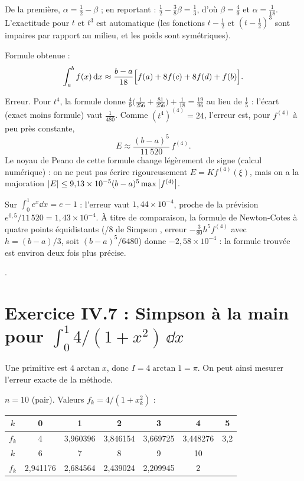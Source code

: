  De la première, $\alpha = \tfrac12 - \beta$ ; en reportant :
$\tfrac12 - \tfrac38\beta = \tfrac13$, d'où $\beta = \tfrac49$ et
$\alpha = \tfrac1{18}$. L'exactitude pour $t$ et $t^3$ est automatique (les
fonctions $t - \tfrac12$ et $(t - \tfrac12)^3$ sont impaires par rapport au
milieu, et les poids sont symétriques).

 Formule obtenue :
\[
  \int_a^b f(x)\,\mathrm{d} x \approx \frac{b-a}{18}\Bigl[f(a) + 8f(c) + 8f(d) + f(b)\Bigr] .
\]

 Erreur. Pour $t^4$, la formule donne
$\tfrac49\bigl(\tfrac1{256} + \tfrac{81}{256}\bigr) + \tfrac1{18} = \tfrac{19}{96}$
au lieu de $\tfrac15$ : l'écart (exact moins formule) vaut $\tfrac1{480}$. Comme
$(t^4)^{(4)} = 24$, l'erreur est, pour $f^{(4)}$ à peu près constante,
\[
  E \approx \frac{(b-a)^5}{11\,520}\,f^{(4)} .
\]
Le noyau de Peano de cette formule change légèrement de signe (calcul
numérique) : on ne peut pas écrire rigoureusement $E = K f^{(4)}(\xi)$, mais
on a la majoration $\left|E\right| \le 9{,}13\times 10^{-5}(b-a)^5\max\left|f^{(4)}\right|$.

\Verif Sur $\int_0^1 e^{x}\dd x = e - 1$ : l'erreur vaut $1{,}44\times 10^{-4}$,
proche de la prévision $e^{0{,}5}/11\,520 = 1{,}43\times 10^{-4}$. À titre de
comparaison, la formule de Newton-Cotes à quatre points équidistants
(/8 de Simpson \fg, erreur $-\tfrac{3}{80}h^5f^{(4)}$ avec
$h = (b-a)/3$, soit $(b-a)^5/6480$) donne $-2{,}58\times 10^{-4}$ : la
formule trouvée est environ deux fois plus précise.

\Refs {}.

\section{\texorpdfstring{Exercice IV.7 : Simpson à la main pour $\int_0^1 4/(1+x^2)\,\dd x$}{Exercice IV.7 : Simpson à la main pour l'intégrale de 4/(1+x²)}}


\Pourquoi Une primitive est $4\arctan x$, donc $I = 4\arctan 1 = \pi$. On peut
ainsi mesurer l'erreur exacte de la méthode.

\Etapes
{} $n = 10$ (pair). Valeurs $f_k = 4/(1 + x_k^2)$ :
\begin{center}
\begin{tabular}{c|cccccc}
  $k$ & 0 & 1 & 2 & 3 & 4 & 5\\ \hline
  $f_k$ & 4 & 3,960396 & 3,846154 & 3,669725 & 3,448276 & 3,2\\[4pt]
  $k$ & 6 & 7 & 8 & 9 & 10 & \\ \hline
  $f_k$ & 2,941176 & 2,684564 & 2,439024 & 2,209945 & 2 &
\end{tabular}
\end{center}

